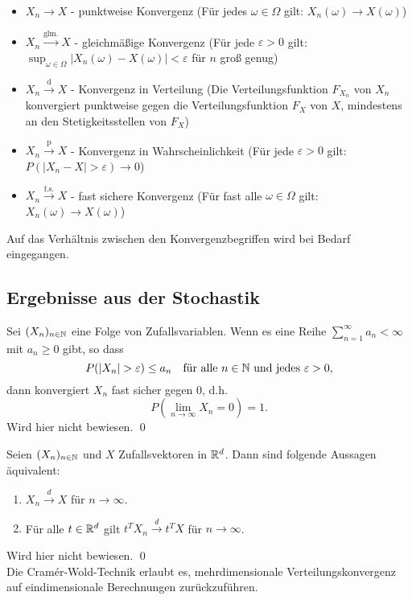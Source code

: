 \begin{itemize}
    \item $X_n \xrightarrow{} X$ - punktweise Konvergenz (Für jedes $\omega \in \Omega$ gilt: $X_n(\omega) \to X(\omega)$)
    \item $X_n \xrightarrow{\mathrm{glm.}} X$ - gleichmäßige Konvergenz (Für jede $\varepsilon > 0$ gilt: $\sup_{\omega \in \Omega} |X_n(\omega) - X(\omega)| < \varepsilon$ für $n$ groß genug)
    \item $X_n \xrightarrow{\mathrm{d}} X$ - Konvergenz in Verteilung (Die Verteilungsfunktion $F_{X_n}$ von $X_n$ konvergiert punktweise gegen die Verteilungsfunktion $F_X$ von $X$, mindestens an den Stetigkeitsstellen von $F_X$)
    \item $X_n \xrightarrow{\mathrm{p}} X$ - Konvergenz in Wahrscheinlichkeit (Für jede $\varepsilon > 0$ gilt: $P(|X_n - X| > \varepsilon) \to 0$)
    \item $X_n \xrightarrow{\mathrm{f.s.}} X$ - fast sichere Konvergenz (Für fast alle $\omega \in \Omega$ gilt: $X_n(\omega) \to X(\omega)$)
\end{itemize}

Auf das Verhältnis zwischen den Konvergenzbegriffen wird bei Bedarf eingegangen.

\subsection{Ergebnisse aus der Stochastik}

\begin{lemma}
Sei $(X_n)_{n \in \Bbb N}$ eine Folge von Zufallsvariablen. Wenn es eine Reihe $\sum_{n=1}^\infty a_n \lt \infty$ mit $a_n \geq 0$ gibt, so dass
$$P(|X_n| > \varepsilon) \leq a_n \quad \text{für alle } n \in \Bbb N \text{ und jedes } \varepsilon > 0,$$
dann konvergiert $X_n$ fast sicher gegen $0$, d.h.
$$P\left(\lim_{n \to \infty} X_n = 0\right) = 1.$$
Wird hier nicht bewiesen. \qed
\end{lemma}

\begin{satz}
Seien $(X_n)_{n \in \Bbb N}$ und $X$ Zufallsvektoren in $\Bbb R^d$. Dann sind folgende Aussagen äquivalent:
\begin{enumerate}
    \item $X_n \xrightarrow{d} X$ für $n \to \infty$.
    \item Für alle $t \in \Bbb R^d$ gilt $t^T X_n \xrightarrow{d} t^T X$ für $n \to \infty$.
\end{enumerate}
Wird hier nicht bewiesen. \qed \\
Die Cramér-Wold-Technik erlaubt es, mehrdimensionale Verteilungskonvergenz auf eindimensionale Berechnungen zurückzuführen.
\end{satz}

